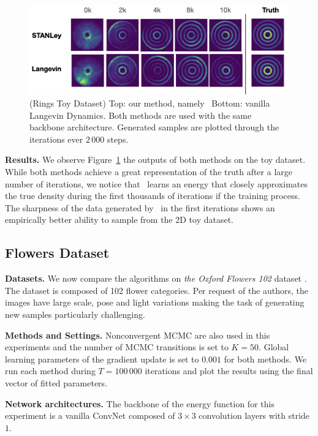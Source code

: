 \documentclass[10pt,twocolumn,letterpaper]{article}
\begin{document}
\begin{figure}[H]
\begin{center}
\includegraphics[width=1.\linewidth]{figs/rings}
\end{center}
   \caption{(Rings Toy Dataset) Top: our method, namely \algo\ Bottom: vanilla Langevin Dynamics. Both methods are used with the same backbone architecture. Generated samples are plotted through the iterations ever $2\,000$ steps.}
\label{fig:resultstoy}
\end{figure}

\medskip
\textbf{Results.} 
We observe Figure~\ref{fig:resultstoy} the outputs of both methods on the toy dataset.
While both methods achieve a great representation of the truth after a large number of iterations, we notice that \algo\ learns an energy that closely approximates the true density during the first thousands of iterations if the training process.
The sharpness of the data generated by \algo\ in the first iterations shows an empirically better ability to sample from the 2D toy dataset.

\subsection{Flowers Dataset}

\textbf{Datasets.}
We now compare the algorithms on \emph{the Oxford Flowers 102} dataset \cite{nilsback2008automated}.
The dataset is composed of 102 flower categories.
Per request of the authors, the images have large scale, pose and light variations making the task of generating new samples particularly challenging.

\medskip
\textbf{Methods and Settings.}
Nonconvergent MCMC are also used in this experiments and the number of MCMC transitions is set to $K = 50$.
Global learning parameters of the gradient update is set to $0.001$ for both methods.
We run each method during $T = 100\,000$ iterations and plot the results using the final vector of fitted parameters.


\medskip
\textbf{Network architectures.} 
The backbone of the energy function for this experiment is a vanilla ConvNet composed of $3 \times 3$ convolution layers with stride $1$.
\end{document}
